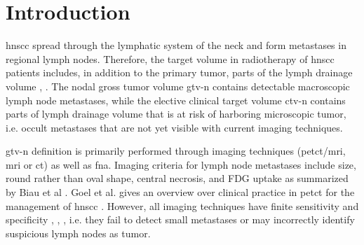 \documentclass[\relativeRoot/main.tex]{subfiles}
\begin{document}
\section{Introduction}
\label{sec:dataset_usz:introduction}

\Gls{hnscc} spread through the lymphatic system of the neck and form metastases in regional lymph nodes. Therefore, the target volume in radiotherapy of \gls{hnscc} patients includes, in addition to the primary tumor, parts of the lymph drainage volume \cite{biau_selection_2019}, \cite{grosu_target_2015}. The nodal gross tumor volume \gls{gtv-n} contains detectable macroscopic lymph node metastases, while the elective clinical target volume \gls{ctv-n} contains parts of lymph drainage volume that is at risk of harboring microscopic tumor, i.e. occult metastases that are not yet visible with current imaging techniques.

\Gls{gtv-n} definition is primarily performed through imaging techniques (\acrshort{pet}\acrshort{ct}/\gls{mri}, \gls{mri} or \gls{ct}) as well as \gls{fna}. Imaging criteria for lymph node metastases include size, round rather than oval shape, central necrosis, and FDG uptake as summarized by Biau et al \cite{biau_selection_2019}. Goel et al. gives an overview over clinical practice in \acrshort{pet}\acrshort{ct} for the management of \gls{hnscc} \cite{goel_clinical_2017}. However, all imaging techniques have finite sensitivity and specificity \cite{park_diagnostic_2020}, \cite{jensen_imaging_2021}, \cite{rohde_18f-fluoro-deoxy-glucose-positron_2014}, i.e. they fail to detect small metastases or may incorrectly identify suspicious lymph nodes as tumor.
\end{document}

